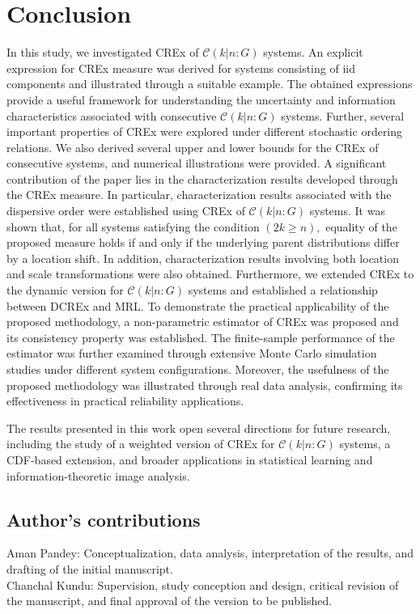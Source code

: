 \documentclass[12pt,a4paper]{article}
\numberwithin{equation}{section}
\begin{document}
\section{Conclusion}
In this study, we investigated CREx of $\mathcal C(k|n{:}G)$ systems. An explicit expression for  CREx measure was derived for systems consisting of iid components and illustrated through a suitable example. The obtained expressions provide a useful framework for understanding the uncertainty and information characteristics associated with consecutive $\mathcal C(k|n{:}G)$ systems.
Further, several important properties of CREx were explored under different stochastic ordering relations.  We also derived several upper and lower bounds for the CREx of consecutive systems, and numerical illustrations were provided. A significant contribution of the paper lies in the characterization results developed through the CREx measure. In particular, characterization results associated with the dispersive order were established using CREx of $\mathcal C(k|n{:}G)$ systems. It was shown that, for all systems satisfying the condition $(2k \geq n),$ equality of the proposed measure holds if and only if the underlying parent distributions differ by a location shift. In addition, characterization results involving both location and scale transformations were also obtained. Furthermore, we extended CREx to the dynamic version for $\mathcal C(k|n{:}G)$ systems and established a relationship between DCREx and MRL.
To demonstrate the practical applicability of the proposed methodology, a non-parametric estimator of CREx was proposed and its consistency property was established. The finite-sample performance of the estimator was further examined through extensive Monte Carlo simulation studies under different system configurations. Moreover, the usefulness of the proposed methodology was illustrated through real data analysis, confirming its effectiveness in practical reliability applications. 

The results presented in this work open several directions for future research, including the study of a weighted version of CREx for $\mathcal C(k|n{:}G)$ systems, a CDF-based extension, and broader applications in statistical learning and information-theoretic image analysis.
\subsection*{Author's contributions}
Aman Pandey:  Conceptualization, data analysis, interpretation of the results, and drafting of the initial manuscript.
\noindent\\
Chanchal Kundu: Supervision, study conception and design, critical revision of the manuscript, and final approval of the version to be published.
\end{document}
